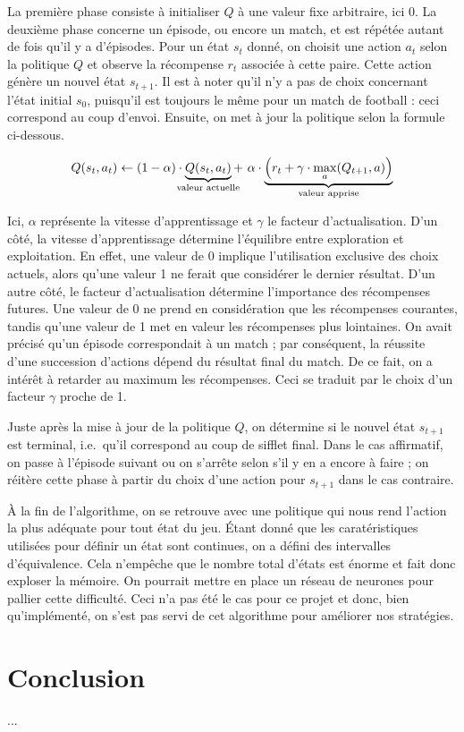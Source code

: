 \documentclass[12pt,a4paper]{article}
\begin{document}
La premi\`ere phase consiste \`a initialiser $Q$ \`a une valeur fixe 
arbitraire, ici 0. La deuxi\`eme phase concerne un \'episode, ou encore un 
match, et est r\'ep\'et\'ee autant de fois qu'il y a d'\'episodes. Pour un 
\'etat $s_t$ donn\'e, on choisit une action $a_t$ selon la politique $Q$ et 
observe la r\'ecompense $r_t$ associ\'ee \`a cette paire. Cette action 
g\'en\`ere un nouvel \'etat $s_{t+1}$. Il est \`a noter qu'il n'y a pas de 
choix concernant l'\'etat initial $s_0$, puisqu'il est toujours le m\^eme pour 
un match de football : ceci correspond au coup d'envoi. Ensuite, on met \`a 
jour la politique selon la formule ci-dessous.

\begin{equation*}
  Q(s_t,a_t) \gets (1-\alpha) \cdot 
  \underbrace{Q(s_t,a_t)}_{\mathclap{\text{valeur actuelle}}} + \ \alpha \cdot 
\underbrace{\Big(r_t + \gamma \cdot \max_a(Q_{t+1},a) 
  \Big)}_{\mathclap{\text{valeur   apprise}}}
\end{equation*}

Ici, $\alpha$ repr\'esente la vitesse d'apprentissage et $\gamma$ le facteur 
d'actualisation. D'un c\^ot\'e, la vitesse d'apprentissage d\'etermine 
l'\'equilibre entre exploration et exploitation. En effet, une valeur de 
0 implique l'utilisation exclusive des choix actuels, alors qu'une 
valeur 1 ne ferait que consid\'erer le dernier r\'esultat.
D'un autre c\^ot\'e, le facteur d'actualisation d\'etermine l'importance des 
r\'ecompenses futures. Une valeur de 0 ne prend en consid\'eration que les 
r\'ecompenses courantes, tandis qu'une valeur de 1 met en valeur les 
r\'ecompenses plus lointaines. On avait pr\'ecis\'e qu'un \'episode 
correspondait \`a un match ; par cons\'equent, la r\'eussite d'une succession 
d'actions d\'epend du r\'esultat final du match. De ce fait, on a int\'er\^et 
\`a retarder au maximum les r\'ecompenses. Ceci se traduit par le choix d'un 
facteur $\gamma$ proche de 1.

Juste apr\`es la mise \`a jour de la politique $Q$, on d\'etermine si le 
nouvel \'etat $s_{t+1}$ est terminal, i.e.\ qu'il correspond au coup de sifflet 
final. Dans le cas affirmatif, on passe \`a l'\'episode suivant ou on s'arr\^ete 
selon s'il y en a encore \`a faire ; on r\'eit\`ere cette phase \`a partir du 
choix d'une action pour $s_{t+1}$ dans le cas contraire.

\`A la fin de l'algorithme, on se retrouve avec une politique qui nous rend 
l'action la plus ad\'equate pour tout \'etat du jeu. \'Etant donn\'e que les 
carat\'eristiques utilis\'ees pour d\'efinir un \'etat sont continues, 
on a d\'efini des intervalles d'\'equivalence. Cela n'emp\^eche que le nombre 
total d'\'etats est \'enorme et fait donc exploser la m\'emoire. On pourrait 
mettre en place un r\'eseau de neurones pour pallier cette difficult\'e. Ceci 
n'a pas \'et\'e le cas pour ce projet et donc, bien qu'impl\'ement\'e, on 
s'est pas servi de cet algorithme pour am\'eliorer nos strat\'egies. 

\newpage

\part*{Conclusion}
...
\end{document}
